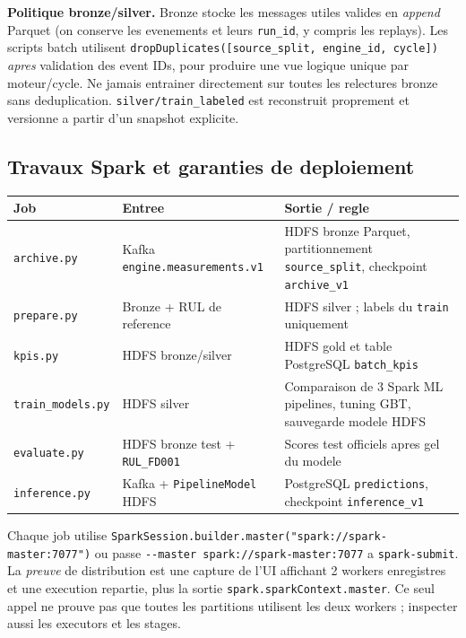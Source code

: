 \documentclass[10pt,a4paper]{article}
\newcommand{\code}[1]{{\small\ttfamily\nolinkurl{#1}}}
\begin{document}
\begin{notebox}
\textbf{Politique bronze/silver.} Bronze stocke les messages utiles valides en \emph{append} Parquet (on conserve les evenements et leurs \code{run_id}, y compris les replays). Les scripts batch utilisent \code{dropDuplicates([source_split, engine_id, cycle])} \emph{apres} validation des event IDs, pour produire une vue logique unique par moteur/cycle. Ne jamais entrainer directement sur toutes les relectures bronze sans deduplication. \code{silver/train_labeled} est reconstruit proprement et versionne a partir d'un snapshot explicite.
\end{notebox}

\subsection{Travaux Spark et garanties de deploiement}
\begin{tabularx}{\linewidth}{@{}p{26mm}p{44mm}Y@{}}
\toprule
\textbf{Job} & \textbf{Entree} & \textbf{Sortie / regle}\\\midrule
\code{archive.py} & Kafka \code{engine.measurements.v1} & HDFS bronze Parquet, partitionnement \code{source_split}, checkpoint \code{archive_v1}\\
\code{prepare.py} & Bronze + RUL de reference & HDFS silver ; labels du \code{train} uniquement\\
\code{kpis.py} & HDFS bronze/silver & HDFS gold et table PostgreSQL \code{batch_kpis}\\
\code{train_models.py} & HDFS silver & Comparaison de 3 Spark ML pipelines, tuning GBT, sauvegarde modele HDFS\\
\code{evaluate.py} & HDFS bronze test + \code{RUL_FD001} & Scores test officiels apres gel du modele\\
\code{inference.py} & Kafka + \code{PipelineModel} HDFS & PostgreSQL \code{predictions}, checkpoint \code{inference_v1}\\
\bottomrule
\end{tabularx}
Chaque job utilise \code{SparkSession.builder.master("spark://spark-master:7077")} ou passe \code{--master spark://spark-master:7077} a \code{spark-submit}. La \emph{preuve} de distribution est une capture de l'UI affichant 2 workers enregistres et une execution repartie, plus la sortie \code{spark.sparkContext.master}. Ce seul appel ne prouve pas que toutes les partitions utilisent les deux workers ; inspecter aussi les executors et les stages.
\end{document}
